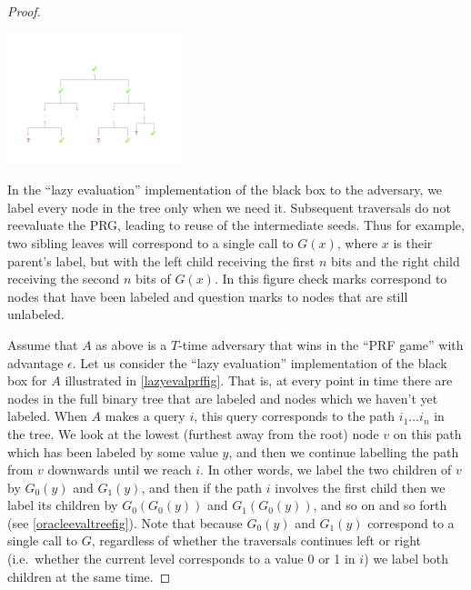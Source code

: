 \begin{proof}
\begin{marginfigure}
\centering
\includegraphics[width=\linewidth, height=1.5in, keepaspectratio]{../figure/Lazy_PRF_from_PRG.jpg}
\caption{In the ``lazy evaluation'' implementation of the black box to
the adversary, we label every node in the tree only when we need it.
Subsequent traversals do not reevaluate the PRG, leading to reuse of the
intermediate seeds. Thus for example, two sibling leaves will correspond
to a single call to \(G(x)\), where \(x\) is their parent's label, but
with the left child receiving the first \(n\) bits and the right child
receiving the second \(n\) bits of \(G(x)\). In this figure check marks
correspond to nodes that have been labeled and question marks to nodes
that are still unlabeled.}
\label{lazyevalprffig}
\end{marginfigure}

Assume that \(A\) as above is a \(T\)-time adversary that wins in the
``PRF game'' with advantage \(\epsilon\). Let us consider the ``lazy
evaluation'' implementation of the black box for \(A\) illustrated in
\cref{lazyevalprffig}. That is, at every point in time there are nodes
in the full binary tree that are labeled and nodes which we haven't yet
labeled. When \(A\) makes a query \(i\), this query corresponds to the
path \(i_1\ldots i_n\) in the tree. We look at the lowest (furthest away
from the root) node \(v\) on this path which has been labeled by some
value \(y\), and then we continue labelling the path from \(v\)
downwards until we reach \(i\). In other words, we label the two
children of \(v\) by \(G_0(y)\) and \(G_1(y)\), and then if the path
\(i\) involves the first child then we label its children by
\(G_0(G_0(y))\) and \(G_1(G_0(y))\), and so on and so forth (see
\cref{oracleevaltreefig}). Note that because \(G_{0}(y)\) and
\(G_{1}(y)\) correspond to a single call to \(G\), regardless of whether
the traversals continues left or right (i.e.~whether the current level
corresponds to a value 0 or 1 in \(i\)) we label both children at the
same time.


\end{proof}
